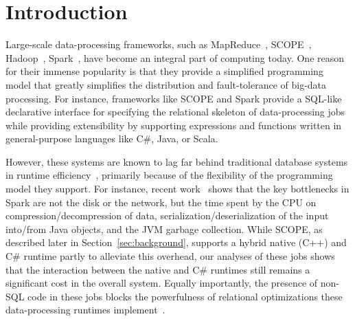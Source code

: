 \section{Introduction}
Large-scale data-processing frameworks, such as MapReduce~\cite{MapReduce}, SCOPE~\cite{SCOPE}, Hadoop~\cite{Hadoop}, Spark~\cite{Spark}, have become an integral part of computing today. One reason for their immense popularity is that they provide a simplified programming model that greatly simplifies the distribution and fault-tolerance of big-data processing. For instance, frameworks like SCOPE and Spark provide a SQL-like declarative interface for specifying the relational skeleton of data-processing jobs while providing extensibility by supporting expressions and functions written in general-purpose languages like C\#, Java, or Scala. 


However, these systems are known to lag far behind traditional database systems in runtime efficiency~\cite{Jahani:2011,Pavlo:2009}, primarily because of the flexibility of the programming model they support. For instance, recent work~\cite{ousterhout-nsdi15} shows that the key bottlenecks in Spark are not the disk or the network, but the time spent by the CPU on compression/decompression of data, serialization/deserialization of the input into/from Java objects, and the JVM garbage collection. While SCOPE, as described later in Section~\ref{sec:background}, supports a hybrid native (C++) and C\# runtime partly to alleviate this overhead, our analyses of these jobs shows that the interaction between the native and C\# runtimes still remains a significant cost in the overall system. Equally importantly, the presence of non-SQL code in these jobs blocks the powerfulness of relational optimizations these data-processing runtimes implement~\cite{non-relational-opt-papers}. 



